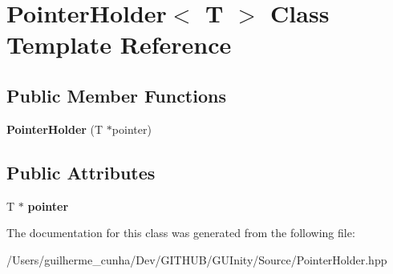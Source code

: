 \hypertarget{class_pointer_holder}{}\section{Pointer\+Holder$<$ T $>$ Class Template Reference}
\label{class_pointer_holder}
\subsection*{Public Member Functions}
\begin{DoxyCompactItemize}
\item 
\hypertarget{class_pointer_holder_a104637c9f641362bae3ab3a03046a3a9}{}{\bfseries Pointer\+Holder} (T $\ast$pointer)\label{class_pointer_holder_a104637c9f641362bae3ab3a03046a3a9}

\end{DoxyCompactItemize}
\subsection*{Public Attributes}
\begin{DoxyCompactItemize}
\item 
\hypertarget{class_pointer_holder_a1a482c769510b45b266b7ed1c99f89f9}{}T $\ast$ {\bfseries pointer}\label{class_pointer_holder_a1a482c769510b45b266b7ed1c99f89f9}

\end{DoxyCompactItemize}


The documentation for this class was generated from the following file\+:\begin{DoxyCompactItemize}
\item 
/\+Users/guilherme\+\_\+cunha/\+Dev/\+G\+I\+T\+H\+U\+B/\+G\+U\+Inity/\+Source/Pointer\+Holder.\+hpp\end{DoxyCompactItemize}
